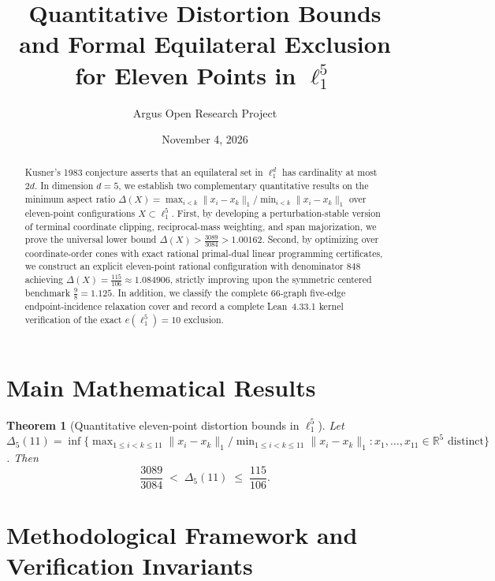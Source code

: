 \documentclass[10pt,reqno]{amsart}
\title[Eleven-Point Distortion Bounds in Five-Dimensional l1]
{Quantitative Distortion Bounds and Formal Equilateral Exclusion for Eleven Points in $\ell_1^5$}
\author{Argus Open Research Project}
\date{November 4, 2026}
\newtheorem{theorem}{Theorem}[section]
\theoremstyle{definition}
\begin{document}
\begin{abstract}
Kusner's 1983 conjecture asserts that an equilateral set in $\ell_1^d$ has cardinality at most $2d$. In dimension $d=5$, we establish two complementary quantitative results on the minimum aspect ratio $\Delta(X) = \max_{i<k}\|x_i-x_k\|_1 / \min_{i<k}\|x_i-x_k\|_1$ over eleven-point configurations $X \subset \ell_1^5$. First, by developing a perturbation-stable version of terminal coordinate clipping, reciprocal-mass weighting, and span majorization, we prove the universal lower bound $\Delta(X) > \frac{3089}{3084} > 1.00162$. Second, by optimizing over coordinate-order cones with exact rational primal-dual linear programming certificates, we construct an explicit eleven-point rational configuration with denominator $848$ achieving $\Delta(X) = \frac{115}{106} \approx 1.084906$, strictly improving upon the symmetric centered benchmark $\frac{9}{8} = 1.125$. In addition, we classify the complete $66$-graph five-edge endpoint-incidence relaxation cover and record a complete Lean~4.33.1 kernel verification of the exact $e(\ell_1^5)=10$ exclusion.
\end{abstract}
\maketitle

\section{Main Mathematical Results}
\begin{theorem}[Quantitative eleven-point distortion bounds in $\ell_1^5$]
Let $\Delta_5(11) = \inf\{\max_{1\le i<k\le 11}\|x_i-x_k\|_1 / \min_{1\le i<k\le 11}\|x_i-x_k\|_1 : x_1,\ldots,x_{11} \in \mathbb{R}^5\text{ distinct}\}$. Then
\[
  \frac{3089}{3084} \;<\; \Delta_5(11) \;\le\; \frac{115}{106}.
\]
\end{theorem}

\section{Methodological Framework and Verification Invariants}
\end{document}
